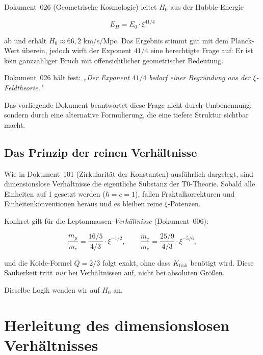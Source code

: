 Dokument~026 (Geometrische Kosmologie) leitet $H_0$ aus der Hubble-Energie

\begin{equation}
    E_H = E_0 \cdot \xi^{41/4}
    \label{eq:EH_026}
\end{equation}

ab und erhält $H_0 \approx 66{,}2$ km/s/Mpc. Das Ergebnis stimmt gut mit dem
Planck-Wert überein, jedoch wirft der Exponent $41/4$ eine berechtigte Frage
auf: Er ist kein ganzzahliger Bruch mit offensichtlicher geometrischer
Bedeutung.

Dokument~026 hält fest: \textit{„Der Exponent $41/4$ bedarf einer Begründung
aus der $\xi$-Feldtheorie."}

Das vorliegende Dokument beantwortet diese Frage nicht durch Umbenennung,
sondern durch eine alternative Formulierung, die eine tiefere Struktur
sichtbar macht.

\subsection{Das Prinzip der reinen Verhältnisse}

Wie in Dokument~101 (Zirkularität der Konstanten) ausführlich dargelegt, sind
dimensionslose Verhältnisse die eigentliche Substanz der T0-Theorie. Sobald
alle Einheiten auf 1 gesetzt werden ($\hbar = c = 1$), fallen Fraktalkorrek\-turen
und Einheitenkonventionen heraus und es bleiben reine $\xi$-Potenzen.

Konkret gilt für die Leptonmassen-\emph{Verhältnisse} (Dokument~006):

\begin{equation}
    \frac{m_\mu}{m_e} = \frac{16/5}{4/3} \cdot \xi^{-1/2}, \qquad
    \frac{m_\tau}{m_e} = \frac{25/9}{4/3} \cdot \xi^{-5/6},
\end{equation}

und die Koide-Formel $Q = 2/3$ folgt exakt, ohne dass $K_\text{frak}$
benötigt wird. Diese Sauberkeit tritt \emph{nur} bei Verhältnissen auf,
nicht bei absoluten Größen.

Dieselbe Logik wenden wir auf $H_0$ an.

\section{Herleitung des dimensionslosen Verhältnisses}
\label{sec:herleitung}

